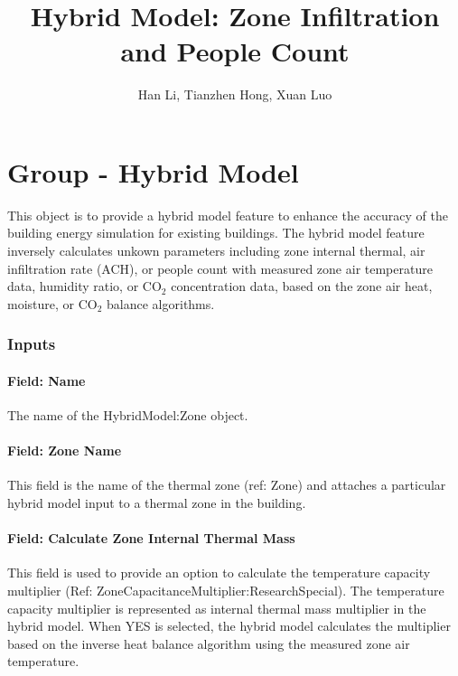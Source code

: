 \documentclass[11pt]{article}
\begin{document}
\title{Hybrid Model: Zone Infiltration and People Count}
\author{Han Li, Tianzhen Hong, Xuan Luo}

\maketitle


\section{Group - Hybrid Model}\label{group---hybrid-model}

This object is to provide a hybrid model feature to enhance the accuracy of the building energy simulation for existing buildings. The hybrid model feature inversely calculates unkown parameters including zone internal thermal, air infiltration rate (ACH), or people count with measured zone air temperature data, humidity ratio, or CO$_2$ concentration data, based on the zone air heat, moisture, or CO$_2$ balance algorithms.

\subsubsection{Inputs}\label{inputs-hm}

\paragraph{Field: Name}\label{field-name-hm}
The name of the HybridModel:Zone object.

\paragraph{Field: Zone Name}\label{field-zone-name-hm}
This field is the name of the thermal zone (ref: Zone) and attaches a particular hybrid model input to a thermal zone in the building.

\paragraph{Field: Calculate Zone Internal Thermal Mass}\label{field-calculate-zon-internal-thermal-mass-hm}
This field is used to provide an option to calculate the temperature capacity multiplier (Ref: ZoneCapacitanceMultiplier:ResearchSpecial). The temperature capacity multiplier is represented as internal thermal mass multiplier in the hybrid model.
When YES is selected, the hybrid model calculates the multiplier based on the inverse heat balance algorithm using the measured zone air temperature.
\end{document}
